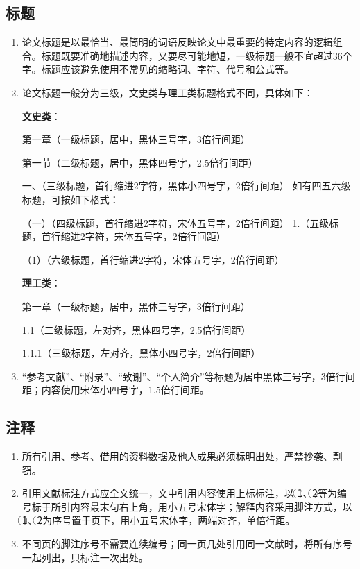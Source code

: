 \subsection{标题}
\begin{enumerate}[label=\arabic*)]
	\item 论文标题是以最恰当、最简明的词语反映论文中最重要的特定内容的逻辑组合。标题既要准确地描述内容，又要尽可能地短，一级标题一般不宜超过36个字。标题应该避免使用不常见的缩略词、字符、代号和公式等。
	
	\item 论文标题一般分为三级，文史类与理工类标题格式不同，具体如下：
	
	{\bfseries 文史类}：
	
	第一章（一级标题，居中，黑体三号字，3倍行间距）
	
	第一节（二级标题，居中，黑体四号字，2.5倍行间距）
	
	一、（三级标题，首行缩进2字符，黑体小四号字，2倍行间距）
	如有四五六级标题，可按如下格式：
	
	（一）（四级标题，首行缩进2字符，宋体五号字，2倍行间距）
	1.（五级标题，首行缩进2字符，宋体五号字，2倍行间距）
	
	（1）（六级标题，首行缩进2字符，宋体五号字，2倍行间距）
	
	{\bfseries 理工类}：
	
	第一章（一级标题，居中，黑体三号字，3倍行间距）
	
	1.1（二级标题，左对齐，黑体四号字，2.5倍行间距）
	
	1.1.1（三级标题，左对齐，黑体小四号字，2倍行间距）
	
	\item “参考文献”、“附录”、“致谢”、“个人简介”等标题为居中黑体三号字，3倍行间距；内容使用宋体小四号字，1.5倍行间距。
	
\end{enumerate}

\subsection{注释}

\begin{enumerate}[label=\arabic*)]
	\item 所有引用、参考、借用的资料数据及他人成果必须标明出处，严禁抄袭、剽窃。
	
	\item 引用文献标注方式应全文统一，文中引用内容使用上标标注，以 \textcircled{1}、\textcircled{2}等为编号标于所引内容最末句右上角，用小五号宋体字；解释内容采用脚注方式，以\textcircled{1}、\textcircled{2}为序号置于页下，用小五号宋体字，两端对齐，单倍行距。
	
	\item 不同页的脚注序号不需要连续编号；同一页几处引用同一文献时，将所有序号一起列出，只标注一次出处。
	
\end{enumerate}

